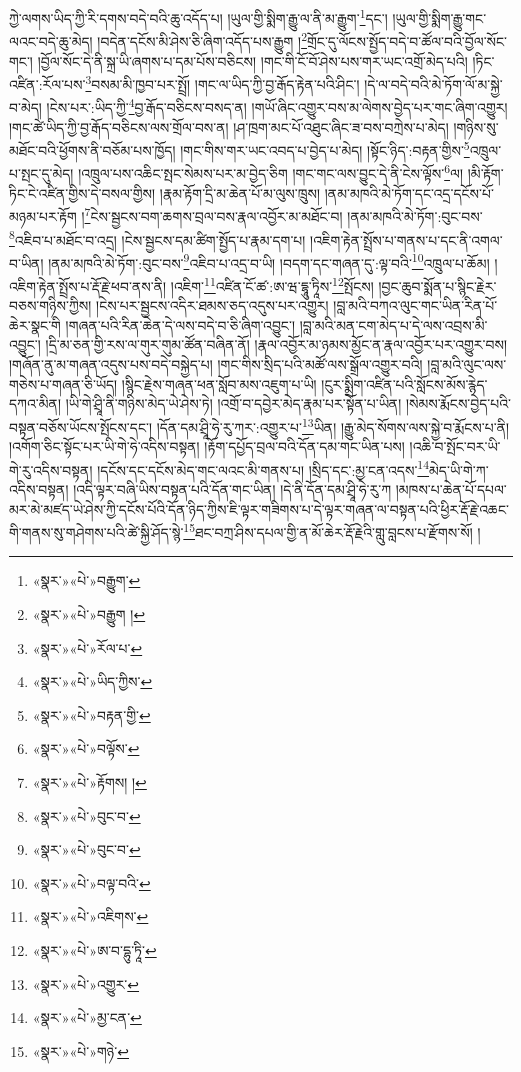ཀྱེ་ལགས་ཡིད་ཀྱི་རི་དགས་བདེ་བའི་ཆུ་འདོད་པ། །ཡུལ་གྱི་སྨིག་རྒྱུ་ལ་ནི་མ་རྒྱུག་\footnote{«སྣར་»«པེ་»བརྒྱུག་}དང་། །ཡུལ་གྱི་སྨིག་རྒྱུ་གང་ལའང་བདེ་ཆུ་མེད། །བདེན་དངོས་མི་ཤེས་ཅི་ཞིག་འདོད་པས་རྒྱུག །\footnote{«སྣར་»«པེ་»བརྒྱུག །}གྲོང་དུ་ལོངས་སྤྱོད་བདེ་བ་ཚོལ་བའི་བྱོལ་སོང་གང་། །བྱོལ་སོང་དེ་ནི་སྐྲ་ཡི་ཞགས་པ་དམ་པོས་བཅིངས། །གང་གི་ངོ་བོ་ཤེས་པས་གར་ཡང་འགྲོ་མེད་པའི། །ཏིང་འཛིན་:རོལ་པས་\footnote{«སྣར་»«པེ་»རོལ་པ་}བསམ་མི་ཁྱབ་པར་སྤྲོ། །གང་ལ་ཡིད་ཀྱི་བྱ་རྒོད་རྟེན་པའི་ཤིང་། །དེ་ལ་བདེ་བའི་མེ་ཏོག་ལོ་མ་སྐྱེ་བ་མེད། །ངེས་པར་:ཡིད་ཀྱི་\footnote{«སྣར་»«པེ་»ཡིད་ཀྱིས་}བྱ་རྒོད་བཅིངས་བསད་ན། །གཡོ་ཞིང་འགྱུར་བས་མ་ལེགས་བྱེད་པར་གང་ཞིག་འགྱུར། །གང་ཚེ་ཡིད་ཀྱི་བྱ་རྒོད་བཅིངས་ལས་གྲོལ་བས་ན། །ཤ་ཁྲག་མང་པོ་འཐུང་ཞིང་ཟ་བས་བཀྲེས་པ་མེད། །གཉིས་སུ་མཐོང་བའི་ཕྱོགས་ནི་བཅོམ་པས་ཁྱོད། །གང་གིས་གར་ཡང་འབད་པ་བྱེད་པ་མེད། །སྟོང་ཉིད་:བརྟན་གྱིས་\footnote{«སྣར་»«པེ་»བརྟན་གྱི་}འཁྲུལ་པ་སྤང་དུ་མེད། །འཁྲུལ་པས་འཆིང་སྤང་སེམས་པར་མ་བྱེད་ཅིག །གང་གང་ལས་བྱུང་དེ་ནི་ངེས་ལྟོས་\footnote{«སྣར་»«པེ་»བལྟོས་}ལ། །མི་རྟོག་ཏིང་ངེ་འཛིན་གྱིས་དེ་བསལ་གྱིས། །རྣམ་རྟོག་དྲི་མ་ཆེན་པོ་མ་ལུས་ཁྲུས། །ནམ་མཁའི་མེ་ཏོག་དང་འདྲ་དངོས་པོ་མཉམ་པར་རྟོག །\footnote{«སྣར་»«པེ་»རྟོགས། །}ངེས་སྦྱངས་བག་ཆགས་བྲལ་བས་རྣལ་འབྱོར་མ་མཐོང་བ། །ནམ་མཁའི་མེ་ཏོག་:བུང་བས་\footnote{«སྣར་»«པེ་»བུང་བ་}འཇིབ་པ་མཐོང་བ་འདྲ། །ངེས་སྦྱངས་དམ་ཚིག་སྤྱོད་པ་རྣམ་དག་པ། །འཇིག་རྟེན་སྤྲོས་པ་གནས་པ་དང་ནི་འགལ་བ་ཡིན། །ནམ་མཁའི་མེ་ཏོག་:བུང་བས་\footnote{«སྣར་»«པེ་»བུང་བ་}འཇིབ་པ་འདྲ་བ་ཡི། །བདག་དང་གཞན་དུ་:ལྟ་བའི་\footnote{«སྣར་»«པེ་»བལྟ་བའི་}འཁྲུལ་པ་ཆོམ། །འཇིག་རྟེན་སྤྲོས་པ་རྡོ་རྗེ་ཕབ་ནས་ནི། །འཇིག་\footnote{«སྣར་»«པེ་»འཇིགས་}འཛིན་ངོ་ཚ་:ཨ་ཝ་དྷཱུ་ཏཱིས་\footnote{«སྣར་»«པེ་»ཨ་བ་དྷུ་ཏཱི་}སྤོངས། །བྱང་ཆུབ་སྨོན་པ་སྙིང་རྗེར་བཅས་གཉིས་ཀྱིས། །ངེས་པར་སྦྱངས་འདིར་ཐམས་ཅད་འདུས་པར་འགྱུར། །བླ་མའི་བཀའ་ལུང་གང་ཡིན་རིན་པོ་ཆེར་སྣང་གི །གཞན་པའི་རིན་ཆེན་དེ་ལས་བདེ་བ་ཅི་ཞིག་འབྱུང་། །བླ་མའི་མན་ངག་མེད་པ་དེ་ལས་འབྲས་མི་འབྱུང་། །དྲི་མ་ཅན་གྱི་རས་ལ་གུར་གུམ་ཚོན་བཞིན་ནོ། །རྣལ་འབྱོར་མ་ཉམས་མྱོང་ན་རྣལ་འབྱོར་པར་འགྱུར་བས། །གཞོན་ནུ་མ་གཞན་འདུས་པས་བདེ་བསྐྱེད་པ། །གང་གིས་སྲིད་པའི་མཚོ་ལས་སྒྲོལ་འགྱུར་བའི། །བླ་མའི་ལུང་ལས་གཅེས་པ་གཞན་ཅི་ཡོད། །སྙིང་རྗེས་གཞན་ཕན་སློབ་མས་འཇུག་པ་ཡི། །ངུར་སྨྲིག་འཛིན་པའི་སློངས་མོས་རྙེད་དཀའ་མིན། །ཡི་གེ་ཤྲཱི་ནི་གཉིས་མེད་ཡེ་ཤེས་ཏེ། །འགྲོ་བ་དབྱེར་མེད་རྣམ་པར་སྟོན་པ་ཡིན། །སེམས་རྨོངས་བྱེད་པའི་བསྟན་བཅོས་ཡོངས་སྤོངས་དང་། །དོན་དམ་ཤྲཱི་ཧེ་རུ་ཀར་:འགྱུར་པ་\footnote{«སྣར་»«པེ་»འགྱུར་}ཡིན། །རྒྱུ་མེད་སོགས་ལས་སྐྱེ་བ་རྨོངས་པ་ནི། །འགོག་ཅིང་སྟོང་པར་ཡི་གེ་ཧེ་འདིས་བསྟན། །རྟོག་དཔྱོད་བྲལ་བའི་དོན་དམ་གང་ཡིན་པས། །འཆི་བ་སྤོང་བར་ཡི་གེ་རུ་འདིས་བསྟན། །དངོས་དང་དངོས་མེད་གང་ལའང་མི་གནས་པ། །སྲིད་དང་:མྱ་ངན་འདས་\footnote{«སྣར་»«པེ་»མྱ་ངན་}མེད་ཡི་གེ་ཀ་འདིས་བསྟན། །འདི་ལྟར་བཞི་ཡིས་བསྟན་པའི་དོན་གང་ཡིན། །དེ་ནི་དོན་དམ་ཤྲཱི་ཧེ་རུ་ཀ །མཁས་པ་ཆེན་པོ་དཔལ་མར་མེ་མཛད་ཡེ་ཤེས་ཀྱི་དངོས་པོའི་དོན་ཉིད་ཀྱིས་ཇི་ལྟར་གཟིགས་པ་དེ་ལྟར་གཞན་ལ་བསྟན་པའི་ཕྱིར་རྡོ་རྗེ་འཆང་གི་གནས་སུ་གཤེགས་པའི་ཚེ་སྐྱི་ཤོད་སྙེ་\footnote{«སྣར་»«པེ་»གཉེ་}ཐང་བཀྲ་ཤིས་དཔལ་གྱི་ན་མོ་ཆེར་རྡོ་རྗེའི་གླུ་བླངས་པ་རྫོགས་སོ། །
 